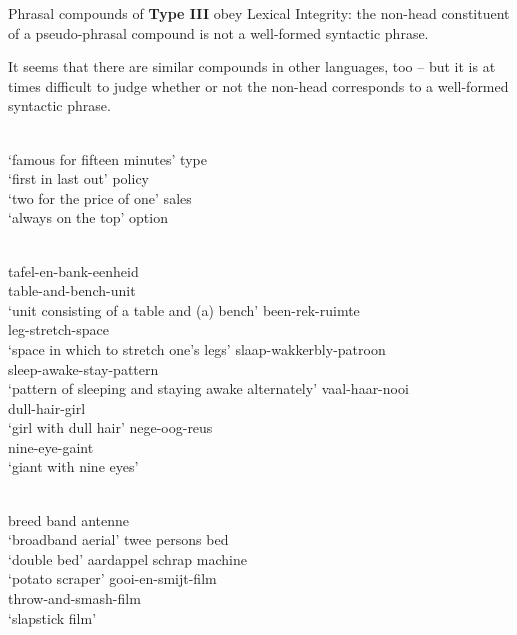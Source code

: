 \documentclass[output=paper]{LSP/langsci}
\begin{document}
Phrasal compounds of \textbf{Type III} obey Lexical Integrity: the non-head con\-stit\-u\-ent of a pseudo-phrasal compound is not a well-formed syntactic phrase.
 
It seems that there are similar compounds in other languages, too – but it is at times difficult to judge whether or not the non-head corresponds to a well-formed syntactic phrase. 

\ea
{}\\
      \ea\label{ex:pafel:17a}
        `famous for fifteen minutes' type   \\ 
      \ex\label{ex:pafel:17b}
         `first in last out' policy     \\
      \ex\label{ex:pafel:17c}
         `two for the price of one' sales    \\
      \ex\label{ex:pafel:17d}
         `always on the top' option 
    \z
\z

\ea
      \\
      \ea\label{ex:pafel:18a}      
      \gll  tafel-en-bank-eenheid\\
            table-and-bench-unit\\
      \glt  `unit consisting of a table and (a) bench'
      \ex\label{ex:pafel:18b}
      \gll   been-rek-ruimte \\
             leg-stretch-space\\
      \glt   `space in which to stretch one's legs'
      \ex\label{ex:pafel:18c}
      \gll   slaap-wakkerbly-patroon \\
             sleep-awake-stay-pattern\\
      \glt   `pattern of sleeping and staying awake alternately' 
      \ex\label{ex:pafel:18d}
      \gll   vaal-haar-nooi \\
             dull-hair-girl\\
      \glt   `girl with dull hair' 
      \ex\label{ex:pafel:18e}
      \gll   nege-oog-reus \\
             nine-eye-gaint\\
      \glt   `giant with nine eyes' 
   \z
\z
  
\ea
      \\
      \ea\label{ex:pafel:19a}      
        breed band antenne      \\
      \glt  `broadband aerial'
      \ex\label{ex:pafel:19b}
         twee persons bed \\
      \glt  `double bed'
     \ex\label{ex:pafel:19c}
         aardappel schrap machine \\
      \glt  `potato scraper'
     \ex\label{ex:pafel:19d}
         gooi-en-smijt-film \\
             throw-and-smash-film  \\
      \glt  `slapstick film'
    \z
\z
 
\end{document}
